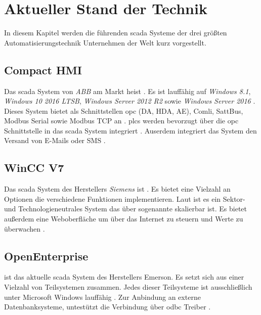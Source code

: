 \chapter{Aktueller Stand der Technik}\label{chapter:actuell}
In diesem Kapitel werden die führenden \ac{scada} Systeme der drei größten Automatisierungstechnik Unternehmen der Welt \citep{umsatzAutomatisierungstechnik} kurz vorgestellt.
\section{Compact HMI}
Das \ac{scada} System von \emph{ABB} am Markt heist .
Es ist lauffähig auf \emph{Windows 8.1}, \emph{Windows 10 2016 LTSB}, \emph{Windows Server 2012 R2} sowie \emph{Windows Server 2016} \citep{abbOverview}.
Dieses System bietet als Schnittstellen \ac{opc} (DA, HDA, AE), Comli, SattBus, Modbus Serial sowie Modbus TCP an \citep{abbOverview}.
\acp{plc} werden bevorzugt über die \ac{opc} Schnittstelle in das \ac{scada} System integriert \citep{abbOverview}.
Auserdem integriert das System den Versand von E-Mails oder SMS \citep{abbOverview}.
\section{WinCC V7}
Das \ac{scada} System des Herstellers \emph{Siemens} ist .
Es bietet eine Vielzahl an Optionen die verschiedene Funktionen implementieren. 
Laut \citet{siemensOverview} ist es ein Sektor- und Technologieneutrales System das über sogenannte 
skalierbar ist. Es bietet außerdem eine Weboberfläche um über das Internet zu steuern und Werte zu überwachen \citep{siemensOverview}.
\section{OpenEnterprise}
 ist das aktuelle \ac{scada} System des Herstellers Emerson.
Es setzt sich aus einer Vielzahl von Teilsystemen zusammen.
Jedes dieser Teilsysteme ist ausschließlich unter Microsoft Windows lauffähig \citep{emersonOverview}.
Zur Anbindung an externe Datenbanksysteme, untestützt  die Verbindung über \ac{odbc} Treiber \citep{emersonOverview}.